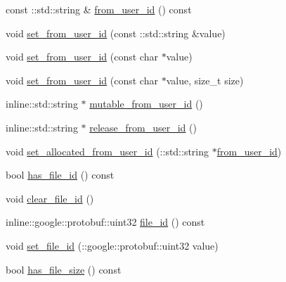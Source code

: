 \begin{DoxyCompactItemize}
\item 
const \+::std\+::string \& \hyperlink{class_i_m_1_1_base_define_1_1_client_offline_file_info_a9463ef5a4ea02c87efdf5e682be05661}{from\+\_\+user\+\_\+id} () const 
\item 
void \hyperlink{class_i_m_1_1_base_define_1_1_client_offline_file_info_a3bb231b0c65434b07f7f416253b17604}{set\+\_\+from\+\_\+user\+\_\+id} (const \+::std\+::string \&value)
\item 
void \hyperlink{class_i_m_1_1_base_define_1_1_client_offline_file_info_aa49ea4ea11bd6f1561743cfd864b3d62}{set\+\_\+from\+\_\+user\+\_\+id} (const char $\ast$value)
\item 
void \hyperlink{class_i_m_1_1_base_define_1_1_client_offline_file_info_aeb9162504859c2a53096594d0e830a05}{set\+\_\+from\+\_\+user\+\_\+id} (const char $\ast$value, size\+\_\+t size)
\item 
inline\+::std\+::string $\ast$ \hyperlink{class_i_m_1_1_base_define_1_1_client_offline_file_info_a9fe5c009719ef553ac77366dc6930ec8}{mutable\+\_\+from\+\_\+user\+\_\+id} ()
\item 
inline\+::std\+::string $\ast$ \hyperlink{class_i_m_1_1_base_define_1_1_client_offline_file_info_a26677d6df9ff37d61bf99b61be614003}{release\+\_\+from\+\_\+user\+\_\+id} ()
\item 
void \hyperlink{class_i_m_1_1_base_define_1_1_client_offline_file_info_a1fe0600badcfb4f1c7c6476c45522631}{set\+\_\+allocated\+\_\+from\+\_\+user\+\_\+id} (\+::std\+::string $\ast$\hyperlink{class_i_m_1_1_base_define_1_1_client_offline_file_info_a9463ef5a4ea02c87efdf5e682be05661}{from\+\_\+user\+\_\+id})
\item 
bool \hyperlink{class_i_m_1_1_base_define_1_1_client_offline_file_info_ab88c40997562f4d16f3db58c80e9200c}{has\+\_\+file\+\_\+id} () const 
\item 
void \hyperlink{class_i_m_1_1_base_define_1_1_client_offline_file_info_a95b808f24fae8b3c4e100accb506d15d}{clear\+\_\+file\+\_\+id} ()
\item 
inline\+::google\+::protobuf\+::uint32 \hyperlink{class_i_m_1_1_base_define_1_1_client_offline_file_info_a42202a75e3f8b6cbedd5aff26ca36865}{file\+\_\+id} () const 
\item 
void \hyperlink{class_i_m_1_1_base_define_1_1_client_offline_file_info_a082045bd2dd602700575c264a9f2f523}{set\+\_\+file\+\_\+id} (\+::google\+::protobuf\+::uint32 value)
\item 
bool \hyperlink{class_i_m_1_1_base_define_1_1_client_offline_file_info_ab94a4a32b3e30f904a9ca2e5467cf185}{has\+\_\+file\+\_\+size} () const 

\end{DoxyCompactItemize}
